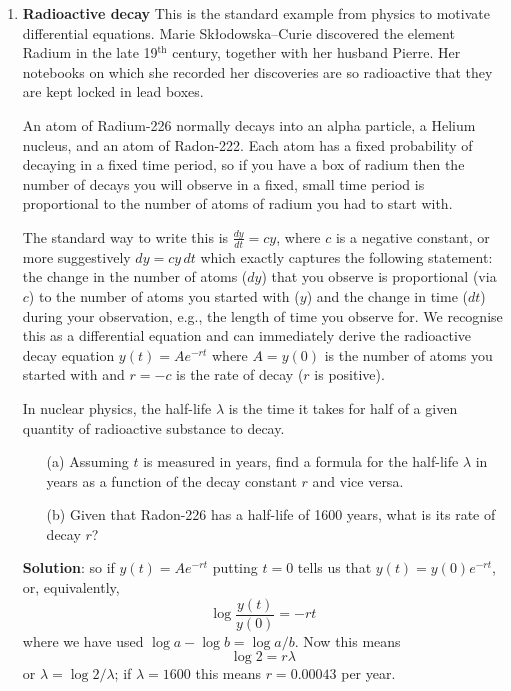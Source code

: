\documentclass[11pt,a4paper]{scrartcl}
\begin{document}
\begin{enumerate}
	\item \textbf{Radioactive decay}
	This is the standard example from physics to motivate differential equations.
	Marie Sk\l{}odowska–Curie discovered the element Radium in the late 19$^\text{th}$ century, together with her husband Pierre. Her notebooks on which she recorded her discoveries are so radioactive that they are kept locked in lead boxes.
	
	An atom of Radium-226 normally decays into an alpha particle,
        a Helium nucleus, and an atom of Radon-222. Each atom has a
        fixed probability of decaying in a fixed time period, so if
        you have a box of radium then the number of decays you will
        observe in a fixed, small time period is proportional to the
        number of atoms of radium you had to start with.
	
	The standard way to write this is $\frac{dy}{dt} = cy$, where
        $c$ is a negative constant, or more suggestively $dy = cy\,dt$
        which exactly captures the following statement: the change in
        the number of atoms ($dy$) that you observe is proportional
        (via $c$) to the number of atoms you started with ($y$) and
        the change in time ($dt$) during your observation, e.g., the
        length of time you observe for.  We recognise this as a
        differential equation and can immediately derive the
        radioactive decay equation $y(t) = Ae^{-rt}$ where $A = y(0)$
        is the number of atoms you started with and $r = -c$ is the
        rate of decay ($r$ is positive).
	
	In nuclear physics, the half-life $\lambda$ is the time it
        takes for half of a given quantity of radioactive substance to
        decay.
	
	\begin{itemize}
		\item[(a)] Assuming $t$ is measured in years, find a
                  formula for the half-life $\lambda$ in years as a
                  function of the decay constant $r$ and vice versa.
		\item[(b)] Given that Radon-226 has a half-life of
                  1600 years, what is its rate of decay $r$?
	\end{itemize}		
        \textbf{Solution}: so if $y(t)=Ae^{-rt}$ putting $t=0$ tells us that $y(t)=y(0)e^{-rt}$, or, equivalently,
        \begin{equation}
          \log{\frac{y(t)}{y(0)}}=-rt
        \end{equation}
        where we have used $\log{a}-\log{b}=\log{a/b}$. Now this means
        \begin{equation}
          \log{2}=r\lambda
        \end{equation}
        or $\lambda=\log{2}/\lambda$; if $\lambda=1600$ this means $r=0.00043$ per year.


\end{enumerate}
\end{document}
